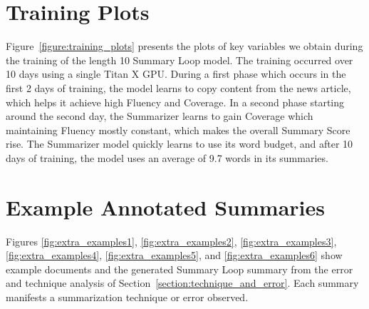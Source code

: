 \documentclass[11pt,a4paper]{article}
\begin{document}
\section{Training Plots}

Figure~\ref{figure:training_plots} presents the plots of key variables we obtain during the training of the length 10 Summary Loop model. The training occurred over 10 days using a single Titan X GPU. During a first phase which occurs in the first 2 days of training, the model learns to copy content from the news article, which helps it achieve high Fluency and Coverage. In a second phase starting around the second day, the Summarizer learns to gain Coverage which maintaining Fluency mostly constant, which makes the overall Summary Score rise. The Summarizer model quickly learns to use its word budget, and  after 10 days of training, the model uses an average of 9.7 words in its summaries.

\begin{figure*}\centering
    \qquad
    \qquad
    \qquad

    \caption{Plots of key variables during the training of the length 10 Summary Loop:  is a plot of the average Fluency Score,  is a plot of the average normalized Coverage Score,  is a plot of the average Summary Score (taking guard-rails into account), and  is a plot of the average number of words in summaries produced.}
    \label{figure:training_plots}
\end{figure*}

\section{Example Annotated Summaries}

Figures \ref{fig:extra_examples1}, \ref{fig:extra_examples2}, \ref{fig:extra_examples3}, \ref{fig:extra_examples4}, \ref{fig:extra_examples5}, and \ref{fig:extra_examples6} show example documents and the generated Summary Loop summary from the error and technique analysis of Section~\ref{section:technique_and_error}. Each summary manifests a summarization technique or error observed.
\end{document}
